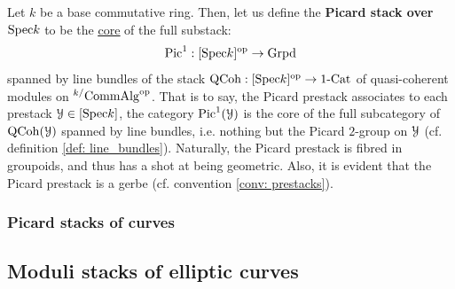                 \begin{definition} \label{def: picard_prestacks}
                    Let $k$ be a base commutative ring. Then, let us define the \textbf{Picard stack over $\mathrm{Spec} k$} to be the \href{https://ncatlab.org/nlab/show/core}{\underline{core}} of the full substack:
                        $$\mathrm{Pic}^1: [\mathrm{Spec} k]^{\mathrm{op}} \to \mathrm{Grpd}$$
                    spanned by line bundles of the stack $\mathrm{QCoh}: [\mathrm{Spec} k]^{\mathrm{op}} \to 1\text{-}\mathrm{Cat}$ of quasi-coherent modules on ${}^{k/}\mathrm{Comm}\mathrm{Alg}^{\mathrm{op}}$. That is to say, the Picard prestack associates to each prestack $\mathcal{Y} \in [\mathrm{Spec} k]$, the category $\mathrm{Pic}^1(\mathcal{Y})$ is the core of the full subcategory of $\mathrm{QCoh}(\mathcal{Y})$ spanned by line bundles, i.e. nothing but the Picard $2$-group on $\mathcal{Y}$ (cf. definition \ref{def: line_bundles}). Naturally, the Picard prestack is fibred in groupoids, and thus has a shot at being geometric. Also, it is evident that the Picard prestack is a gerbe (cf. convention \ref{conv: prestacks}).
                \end{definition}
            
            \subsubsection{Picard stacks of curves}
            
        \subsection{Moduli stacks of elliptic curves}
